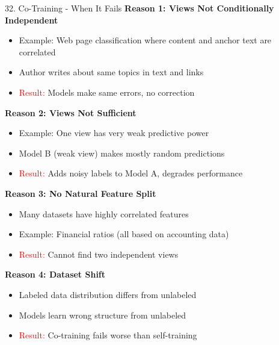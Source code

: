 \documentclass[8pt]{beamer}
\begin{document}
	\begin{frame}{32. Co-Training - When It Fails}
		\fontsize{6.5}{7.5}\selectfont
		\textbf{Reason 1: Views Not Conditionally Independent}
		\begin{itemize}
			\item Example: Web page classification where content and anchor text are correlated
			\item Author writes about same topics in text and links
			\item \textcolor{red}{Result:} Models make same errors, no correction
		\end{itemize}
		
		\textbf{Reason 2: Views Not Sufficient}
		\begin{itemize}
			\item Example: One view has very weak predictive power
			\item Model B (weak view) makes mostly random predictions
			\item \textcolor{red}{Result:} Adds noisy labels to Model A, degrades performance
		\end{itemize}
		
		\textbf{Reason 3: No Natural Feature Split}
		\begin{itemize}
			\item Many datasets have highly correlated features
			\item Example: Financial ratios (all based on accounting data)
			\item \textcolor{red}{Result:} Cannot find two independent views
		\end{itemize}
		
		\textbf{Reason 4: Dataset Shift}
		\begin{itemize}
			\item Labeled data distribution differs from unlabeled
			\item Models learn wrong structure from unlabeled
			\item \textcolor{red}{Result:} Co-training fails worse than self-training
		\end{itemize}
	\end{frame}
	
	
\end{document}
